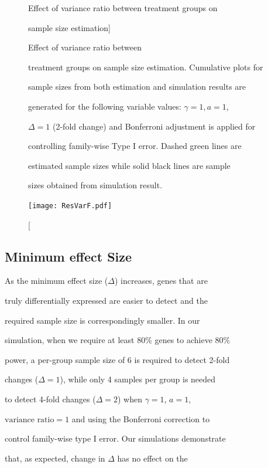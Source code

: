 \documentclass[12pt]{article}
\begin{document}
\begin{figure}%

  \caption[Effect of variance ratio between treatment groups on

    sample size estimation] {Effect of variance ratio between

    treatment groups on sample size estimation.  Cumulative plots for

    sample sizes from both estimation and simulation results are

    generated for the following variable values: $\gamma = 1, a = 1$,

    $\Delta = 1$ (2-fold change) and Bonferroni adjustment is applied for

    controlling family-wise Type I error. Dashed green lines are

    estimated sample sizes while solid black lines are sample

    sizes obtained from simulation result.}

  \label{fig:ResVar}

  \centerline{\texttt{[image: ResVarF.pdf]}}

\end{figure}



\subsection{Minimum effect Size}



As the minimum effect size ($\Delta$) increases, genes that are

truly differentially expressed are easier to detect and the

required sample size is correspondingly smaller.  In our

simulation, when we require at least 80\% genes to achieve 80\%

power, a per-group sample size of 6 is required to detect 2-fold

changes ($\Delta = 1$), while only 4 samples per group is needed

to detect 4-fold changes ($\Delta = 2$) when $\gamma=1$, $a=1$,

$\text{variance ratio}=1$ and using the Bonferroni correction to

control family-wise type I error. Our simulations demonstrate

that, as expected, change in $\Delta$ has no effect on the
\end{document}
